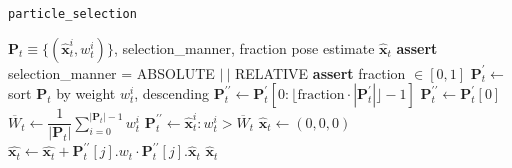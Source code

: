 \begin{algorithm}[h]
  \caption{\texttt{particle\_selection}}
  \begin{spacing}{1.2}
  \begin{algorithmic}[1]
    \REQUIRE $\bm{P}_t \equiv \{(\hat{\bm{x}}_t^i, w_t^i)\}$, selection\_manner, fraction
    \ENSURE pose estimate $\hat{\bm{x}}_t$
    \STATE \textbf{assert} selection\_manner = ABSOLUTE $|\ |$ RELATIVE
    \STATE \textbf{assert} fraction $\in [0,1]$
      \STATE $\bm{P}_t^\prime \leftarrow $ sort $\bm{P}_t$ by weight $w_t^i$, descending
        \STATE $\bm{P}_t^{\prime\prime} \leftarrow \bm{P}_t^\prime[0: \lfloor\text{fraction}\cdot|\bm{P}_t^\prime| \rfloor - 1]$
      \ELSE
        \STATE $\bm{P}_t^{\prime\prime} \leftarrow \bm{P}_t^\prime[0]$
      \ENDIF
    \ENDIF
      \STATE $\overline{W}_t \leftarrow \dfrac{1}{|\bm{P}_t|}\sum\limits_{i=0}^{|\bm{P}_t|-1} w_t^i$
      \STATE $\bm{P}_t^{\prime\prime} \leftarrow \hat{\bm{x}}_t^i : w_t^i > \overline{W}_t$
    \ENDIF
    \STATE $\hat{\bm{x}}_t \leftarrow (0,0,0)$
      \STATE $\hat{\bm{x}_t} \leftarrow \hat{\bm{x}_t} + \bm{P}_t^{\prime\prime}[j].w_t \cdot \bm{P}_t^{\prime\prime}[j].\hat{\bm{x}}_t$
    \ENDFOR
    \RETURN $\hat{\bm{x}}_t$
  \end{algorithmic}
  \end{spacing}
  \label{alg:particle_selection}
\end{algorithm}

